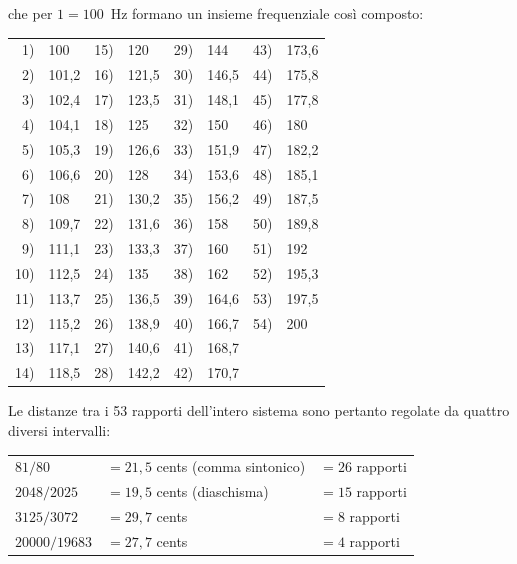 che per $1 = 100$~Hz formano un insieme frequenziale così composto:

\begin{center}\small
\begin{tabular}{r l @{\qquad} r l @{\qquad} r l @{\qquad} r l}
   1) & 100   & 15) & 120   & 29) & 144   & 43) & 173,6 \\
   2) & 101,2 & 16) & 121,5 & 30) & 146,5 & 44) & 175,8 \\
   3) & 102,4 & 17) & 123,5 & 31) & 148,1 & 45) & 177,8 \\
   4) & 104,1 & 18) & 125   & 32) & 150   & 46) & 180 \\
   5) & 105,3 & 19) & 126,6 & 33) & 151,9 & 47) & 182,2 \\
   6) & 106,6 & 20) & 128   & 34) & 153,6 & 48) & 185,1 \\
   7) & 108   & 21) & 130,2 & 35) & 156,2 & 49) & 187,5 \\
   8) & 109,7 & 22) & 131,6 & 36) & 158   & 50) & 189,8 \\
   9) & 111,1 & 23) & 133,3 & 37) & 160   & 51) & 192 \\
  10) & 112,5 & 24) & 135   & 38) & 162   & 52) & 195,3 \\
  11) & 113,7 & 25) & 136,5 & 39) & 164,6 & 53) & 197,5 \\
  12) & 115,2 & 26) & 138,9 & 40) & 166,7 & 54) & 200 \\
  13) & 117,1 & 27) & 140,6 & 41) & 168,7 &     & \\
  14) & 118,5 & 28) & 142,2 & 42) & 170,7 &     & \\
\end{tabular}
\end{center}

Le distanze tra i 53 rapporti dell'intero sistema sono pertanto regolate da
quattro diversi intervalli:

\begin{center}
\begin{tabular}{l l l}
  $81/80$         & $= 21{,}5$ cents (comma sintonico) & $= 26$ rapporti \\
  $2048/2025$     & $= 19{,}5$ cents (diaschisma)       & $= 15$ rapporti \\
  $3125/3072$     & $= 29{,}7$ cents                    & $= 8$ rapporti \\
  $20000/19683$   & $= 27{,}7$ cents                    & $= 4$ rapporti \\
\end{tabular}
\end{center}
